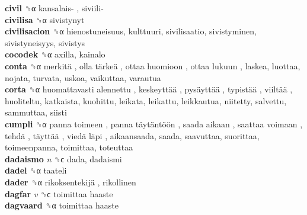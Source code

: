 \textbf{civil} ␝α   kansalais- ,  siviili-   \\
\textbf{civilisa} ␝α  sivistynyt  \\
\textbf{civilisacion} ␝α  hienostuneisuus, kulttuuri, sivilisaatio, sivistyminen, sivistyneisyys, sivistys  \\
\textbf{cocodek} ␝α  axilla, kainalo  \\
\textbf{conta} ␝α   merkitä ,  olla tärkeä ,  ottaa huomioon ,  ottaa lukuun , laskea, luottaa, nojata, turvata, uskoa, vaikuttaa, varautua  \\
\textbf{corta} ␝α   huomattavasti alennettu ,  keskeyttää ,  pysäyttää ,  typistää ,  viiltää , huoliteltu, katkaista, kuohittu, leikata, leikattu, leikkautua, niitetty, salvettu, sammuttaa, siisti  \\
\textbf{cumpli} ␝α   panna toimeen ,  panna täytäntöön ,  saada aikaan ,  saattaa voimaan ,  tehdä ,  täyttää ,  viedä läpi , aikaansaada, saada, saavuttaa, suorittaa, toimeenpanna, toimittaa, toteuttaa  \\
\textbf{dadaismo} \emph{n}  ␝ϲ  dada, dadaismi  \\
\textbf{dadel} ␝α  taateli  \\
\textbf{dader} ␝α   rikoksentekijä , rikollinen  \\
\textbf{dagfar} \emph{v}  ␝ϲ   toimittaa haaste   \\
\textbf{dagvaard} ␝α   toimittaa haaste   \\
